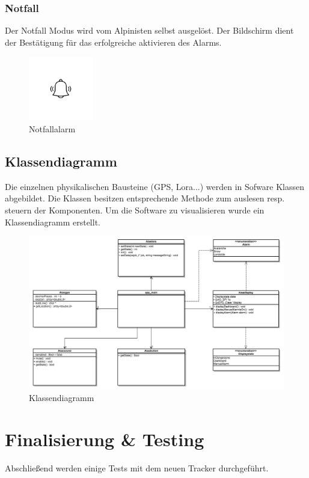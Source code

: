 \documentclass[11pt,english,german]{report}
\theoremstyle{definition}
\begin{document}
\subsubsection{Notfall}
Der Notfall Modus wird vom Alpinisten selbst ausgelöst. Der Bildschirm dient der Bestätigung für das erfolgreiche aktivieren des Alarms.
\begin{figure}[H]
	\centering
	\includegraphics[width=0.25\textwidth]{img/prototype/alarmbell.jpg}
	\caption[Notfallalarm]
	{Notfallalarm}
\end{figure}%

\newpage
\subsection{Klassendiagramm}
Die einzelnen physikalischen Bausteine (GPS, Lora...) werden in Sofware Klassen abgebildet. Die Klassen besitzen entsprechende Methode zum auslesen resp. steuern der Komponenten. Um die Software zu visualisieren wurde ein Klassendiagramm erstellt.
\begin{figure}[H]
	\centering
	\includegraphics[width=\textwidth]{img/classdiagram.jpg}
	\caption[Klassendiagramm]
	{Klassendiagramm}
\end{figure}

\newpage
\section{Finalisierung \& Testing}
Abschließend werden einige Tests mit dem neuen Tracker durchgeführt.
\end{document}

